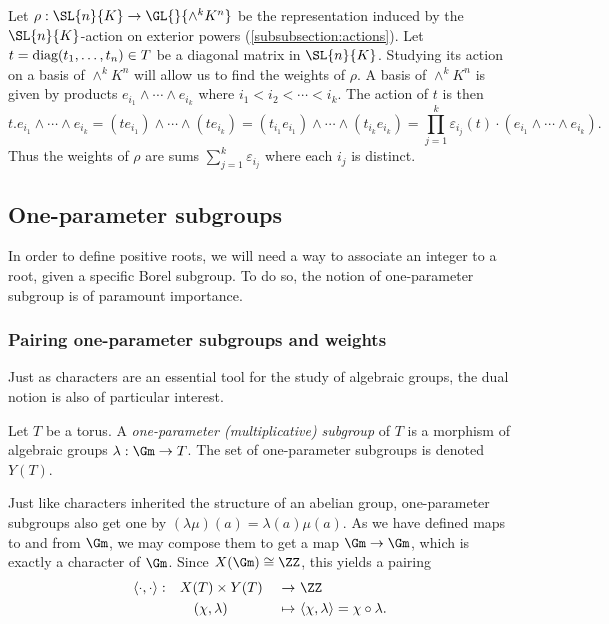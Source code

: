\begin{exmp}\label{ex:sym_rep}
    Let ${\rho: \SL{n}{K} \to \GL{}{\wedge^k K^n}}$ be the representation induced by the $\SL{n}{K}$-action on exterior powers (\cref{subsubsection:actions}). Let $t = \textnormal{diag}(t_1, \ldots, t_n)\in T$ be a diagonal matrix in $\SL{n}{K}$. Studying its action on a basis of $\wedge^k K^n$ will allow us to find the weights of $\rho$. A basis of $\wedge^k K^n$ is given by products $e_{i_1} \wedge \cdots \wedge e_{i_k}$ where $i_1 < i_2 < \cdots < i_k$. The action of $t$ is then
    \[ t . e_{i_1} \wedge \cdots \wedge e_{i_k} = (t e_{i_1}) \wedge \cdots \wedge (t e_{i_k}) = (t_{i_1} e_{i_1}) \wedge \cdots \wedge (t_{i_k} e_{i_k}) = \prod_{j = 1}^k \varepsilon_{i_j}(t) \cdot (e_{i_1} \wedge \cdots \wedge e_{i_k}).\]
    Thus the weights of $\rho$ are sums $\sum_{j = 1}^k \varepsilon_{i_j}$ where each $i_j$ is distinct.
\end{exmp}
\subsection{One-parameter subgroups}

In order to define positive roots, we will need a way to associate an integer to a root, given a specific Borel subgroup. To do so, the notion of one-parameter subgroup is of paramount importance. 

\subsubsection{Pairing one-parameter subgroups and weights}

Just as characters are an essential tool for the study of algebraic groups, the dual notion is also of particular interest.
\begin{defn}
    Let $T$ be a torus. A \emph{one-parameter (multiplicative) subgroup} of $T$ is a morphism of algebraic groups $\lambda : \Gm \rightarrow T$. The set of one-parameter subgroups is denoted $Y(T)$.
\end{defn}
Just like characters inherited the structure of an abelian group, one-parameter subgroups also get one by $(\lambda \mu)(a) = \lambda(a)\mu(a)$. As we have defined maps to and from $\Gm$, we may compose them to get a map $\Gm \to \Gm$, which is exactly a character of $\Gm$. Since ${X(\Gm) \cong \ZZ}$, this yields a pairing 
\begin{alignat*}{4}
    \langle \cdot , \cdot \rangle: \quad & X(T) \times Y(T) &\ \to\ &\ZZ\\
           & \quad (\chi, \lambda) &\ \mapsto\ &\langle \chi, \lambda \rangle = \chi \circ \lambda.
\end{alignat*}

